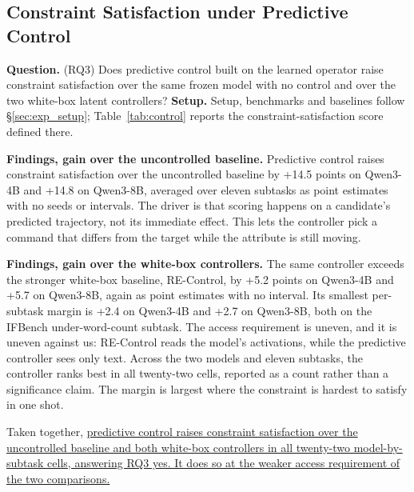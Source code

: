 \subsection{Constraint Satisfaction under Predictive Control}
\label{sec:exp_control}

\textbf{Question.} (RQ3) Does predictive control built on the learned operator raise constraint satisfaction over the same frozen model with no control and over the two white-box latent controllers?
\textbf{Setup.} Setup, benchmarks and baselines follow \S\ref{sec:exp_setup}; Table~\ref{tab:control} reports the constraint-satisfaction score defined there.



\textbf{Findings, gain over the uncontrolled baseline.} Predictive control raises constraint satisfaction over the uncontrolled baseline by +14.5 points on Qwen3-4B and +14.8 on Qwen3-8B, averaged over eleven subtasks as point estimates with no seeds or intervals.  %
The driver is that scoring happens on a candidate's predicted trajectory, not its immediate effect.  %
This lets the controller pick a command that differs from the target while the attribute is still moving.  %

\textbf{Findings, gain over the white-box controllers.} The same controller exceeds the stronger white-box baseline, RE-Control, by +5.2 points on Qwen3-4B and +5.7 on Qwen3-8B, again as point estimates with no interval.  %
Its smallest per-subtask margin is +2.4 on Qwen3-4B and +2.7 on Qwen3-8B, both on the IFBench under-word-count subtask.  %
The access requirement is uneven, and it is uneven against us: RE-Control reads the model's activations, while the predictive controller sees only text.  %
Across the two models and eleven subtasks, the controller ranks best in all twenty-two cells, reported as a count rather than a significance claim.  %
The margin is largest where the constraint is hardest to satisfy in one shot.  %

Taken together, \uline{predictive control raises constraint satisfaction over the uncontrolled baseline and both white-box controllers in all twenty-two model-by-subtask cells, answering RQ3 yes. It does so at the weaker access requirement of the two comparisons.}

